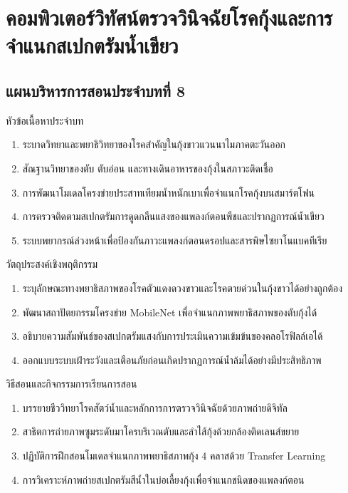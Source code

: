 \chapter{คอมพิวเตอร์วิทัศน์ตรวจวินิจฉัยโรคกุ้งและการจำแนกสเปกตรัมน้ำเขียว}
\label{chap:ch08}

\section*{แผนบริหารการสอนประจำบทที่ 8}

\begin{planbox}{หัวข้อเนื้อหาประจำบท}
\begin{enumerate}[topsep=2pt, itemsep=1pt, partopsep=0pt, parsep=0pt, leftmargin=1.5em]
    \item ระบาดวิทยาและพยาธิวิทยาของโรคสำคัญในกุ้งขาวแวนนาไมภาคตะวันออก
    \item สัณฐานวิทยาของตับ ตับอ่อน และทางเดินอาหารของกุ้งในสภาวะติดเชื้อ
    \item การพัฒนาโมเดลโครงข่ายประสาทเทียมน้ำหนักเบาเพื่อจำแนกโรคกุ้งบนสมาร์ตโฟน
    \item การตรวจติดตามสเปกตรัมการดูดกลืนแสงของแพลงก์ตอนพืชและปรากฏการณ์น้ำเขียว
    \item ระบบพยากรณ์ล่วงหน้าเพื่อป้องกันภาวะแพลงก์ตอนดรอปและสารพิษไซยาโนแบคทีเรีย
\end{enumerate}
\end{planbox}

\begin{planbox}{วัตถุประสงค์เชิงพฤติกรรม}
\begin{enumerate}[topsep=2pt, itemsep=1pt, partopsep=0pt, parsep=0pt, leftmargin=1.5em]
    \item ระบุลักษณะทางพยาธิสภาพของโรคตัวแดงดวงขาวและโรคตายด่วนในกุ้งขาวได้อย่างถูกต้อง
    \item พัฒนาสถาปัตยกรรมโครงข่าย MobileNet เพื่อจำแนกภาพพยาธิสภาพของตับกุ้งได้
    \item อธิบายความสัมพันธ์ของสเปกตรัมแสงกับการประเมินความเข้มข้นของคลอโรฟิลล์เอได้
    \item ออกแบบระบบเฝ้าระวังและเตือนภัยก่อนเกิดปรากฏการณ์น้ำล้มได้อย่างมีประสิทธิภาพ
\end{enumerate}
\end{planbox}

\newpage

\begin{planbox}{วิธีสอนและกิจกรรมการเรียนการสอน}
\begin{enumerate}[topsep=2pt, itemsep=1pt, partopsep=0pt, parsep=0pt, leftmargin=1.5em]
    \item บรรยายชีววิทยาโรคสัตว์น้ำและหลักการการตรวจวินิจฉัยด้วยภาพถ่ายดิจิทัล
    \item สาธิตการถ่ายภาพซูมระดับมาโครบริเวณตับและลำไส้กุ้งด้วยกล้องติดเลนส์ขยาย
    \item ปฏิบัติการฝึกสอนโมเดลจำแนกภาพพยาธิสภาพกุ้ง 4 คลาสด้วย Transfer Learning
    \item การวิเคราะห์ภาพถ่ายสเปกตรัมสีน้ำในบ่อเลี้ยงกุ้งเพื่อจำแนกชนิดของแพลงก์ตอน
\end{enumerate}
\end{planbox}

